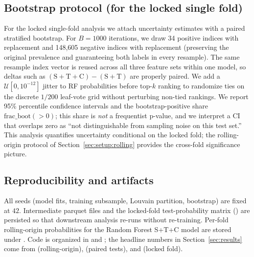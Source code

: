 \subsection{Bootstrap protocol (for the locked single fold)}
\label{sec:setup:bootstrap}
For the locked single-fold analysis we attach uncertainty estimates
with a paired stratified bootstrap. For $B = 1000$ iterations, we
draw 34 positive indices with replacement and 148{,}605 negative
indices with replacement (preserving the original prevalence and
guaranteeing both labels in every resample). The same resample index
vector is reused across all three feature sets within one model, so
deltas such as
$(\mathrm{S}{+}\mathrm{T}{+}\mathrm{C}) - (\mathrm{S}{+}\mathrm{T})$
are properly paired. We add a $\mathcal{U}[0, 10^{-12}]$ jitter to RF
probabilities before top-$k$ ranking to randomize ties on the
discrete $1/200$ leaf-vote grid without perturbing non-tied rankings.
We report 95\% percentile confidence intervals and the
bootstrap-positive share $\mathrm{frac\_boot}(>0)$; this share is
\emph{not} a frequentist p-value, and we interpret a CI that overlaps
zero as ``not distinguishable from sampling noise on this test set.''
This analysis quantifies uncertainty conditional on the locked fold;
the rolling-origin protocol of Section~\ref{sec:setup:rolling}
provides the cross-fold significance picture.

\subsection{Reproducibility and artifacts}
All seeds (model fits, training subsample, Louvain partition,
bootstrap) are fixed at $42$. Intermediate parquet files and the
locked-fold test-probability matrix
() are persisted so that
downstream analysis re-runs without re-training. Per-fold rolling-origin probabilities for the Random Forest S+T+C model are stored
under . Code is organized in
 and ; the headline numbers in
Section~\ref{sec:results} come from
 (rolling-origin),
 (paired tests), and
 (locked fold).

